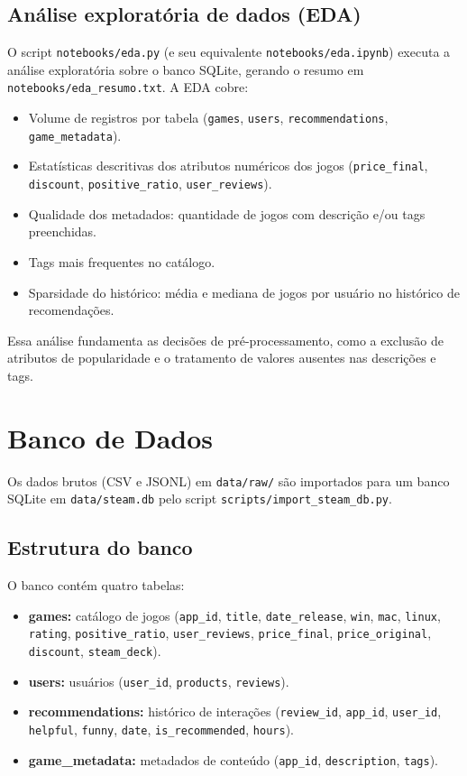 \documentclass[12pt,a4paper]{article}
\begin{document}
\subsection{Análise exploratória de dados (EDA)}

O script \texttt{notebooks/eda.py} (e seu equivalente \texttt{notebooks/eda.ipynb}) executa a análise exploratória sobre o banco SQLite, gerando o resumo em \texttt{notebooks/eda\_resumo.txt}. A EDA cobre:

\begin{itemize}
    \item Volume de registros por tabela (\texttt{games}, \texttt{users}, \texttt{recommendations}, \texttt{game\_metadata}).
    \item Estatísticas descritivas dos atributos numéricos dos jogos (\texttt{price\_final}, \texttt{discount}, \texttt{positive\_ratio}, \texttt{user\_reviews}).
    \item Qualidade dos metadados: quantidade de jogos com descrição e/ou tags preenchidas.
    \item Tags mais frequentes no catálogo.
    \item Sparsidade do histórico: média e mediana de jogos por usuário no histórico de recomendações.
\end{itemize}

Essa análise fundamenta as decisões de pré-processamento, como a exclusão de atributos de popularidade e o tratamento de valores ausentes nas descrições e tags.

\section{Banco de Dados}

Os dados brutos (CSV e JSONL) em \texttt{data/raw/} são importados para um banco SQLite em \texttt{data/steam.db} pelo script \texttt{scripts/import\_steam\_db.py}.

\subsection{Estrutura do banco}

O banco contém quatro tabelas:

\begin{itemize}
    \item \textbf{games:} catálogo de jogos (\texttt{app\_id}, \texttt{title}, \texttt{date\_release}, \texttt{win}, \texttt{mac}, \texttt{linux}, \texttt{rating}, \texttt{positive\_ratio}, \texttt{user\_reviews}, \texttt{price\_final}, \texttt{price\_original}, \texttt{discount}, \texttt{steam\_deck}).
    \item \textbf{users:} usuários (\texttt{user\_id}, \texttt{products}, \texttt{reviews}).
    \item \textbf{recommendations:} histórico de interações (\texttt{review\_id}, \texttt{app\_id}, \texttt{user\_id}, \texttt{helpful}, \texttt{funny}, \texttt{date}, \texttt{is\_recommended}, \texttt{hours}).
    \item \textbf{game\_metadata:} metadados de conteúdo (\texttt{app\_id}, \texttt{description}, \texttt{tags}).
\end{itemize}
\end{document}
